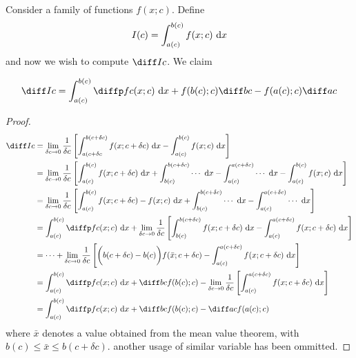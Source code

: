 \documentclass[12pt]{article}
\begin{document}
Consider a family of functions $f(x;c)$. Define
\[
    I(c) = \int_{a(c)}^{b(c)} f(x;c) \ \mathrm{d} x
\]
and now we wish to compute $\diff Ic$.
We claim
\begin{theorem}
    \[
    \diff Ic = 
    \int_{a(c)}^{b(c)}\diffp fc (x;c) \di x
    + f(b(c);c)\diff bc
    - f(a(c);c)\diff ac
    \]
\end{theorem}
\begin{proof}
    \begin{align*}
        \diff Ic 
        &= \lim_{\delta c \to 0}\frac{1}{\delta c}
        \left[
            \int_{a(c+\delta c}^{b(c+\delta c)} f(x;c+\delta c) \di x
        - \int_{a(c)}^{b(c)} f(x;c) \di x
        \right]\\
        &= \lim_{\delta c \to 0}\frac{1}{\delta c}
        \left[
            \int_{a(c)}^{b(c)} f(x;c+\delta c) \di x
            +\int_{b(c)}^{b(c+\delta c)} \cdots \di x
            -\int_{a(c)}^{a(c+\delta c)} \cdots \di x
            - \int_{a(c)}^{b(c)} f(x;c) \di x
        \right]\\
        &= \lim_{\delta c \to 0}\frac{1}{\delta c}
        \left[
            \int_{a(c)}^{b(c)} f(x;c+\delta c)
            - f(x;c) \di x
            +\int_{b(c)}^{b(c+\delta c)} \cdots \di x
            -\int_{a(c)}^{a(c+\delta c)} \cdots \di x
        \right]\\
        &= 
            \int_{a(c)}^{b(c)} \diffp fc (x;c) \di x
        + \lim_{\delta c \to 0}\frac{1}{\delta c}
        \left[
            \int_{b(c)}^{b(c+\delta c)} f(x;c+\delta c) \di x
            -\int_{a(c)}^{a(c+\delta c)} f(x;c+\delta c) \di x
        \right]\\
        &= 
        \cdots
        + \lim_{\delta c \to 0}\frac{1}{\delta c}
        \left[
            \biggl(b(c+\delta c) - b(c)\biggr)f(\bar x ; c + \delta c)
            -\int_{a(c)}^{a(c+\delta c)} f(x;c+\delta c) \di x
        \right]\\
        &= 
        \int_{a(c)}^{b(c)} \diffp fc (x;c) \di x
        + \diff bc f(b(c); c)
        - \lim_{\delta c \to 0}\frac{1}{\delta c}
        \left[
            \int_{a(c)}^{a(c+\delta c)} f(x;c+\delta c) \di x
        \right]\\
        &= 
        \int_{a(c)}^{b(c)} \diffp fc (x;c) \di x
        + \diff bc f(b(c); c)
        - \diff ac f(a(c); c)
    \end{align*}
    where $\bar x$ denotes a value
    obtained from the mean value theorem, with $b(c) \le \bar x \le b(c + \delta c)$.
    another usage of similar variable has been ommitted.
\end{proof}
\end{document}
